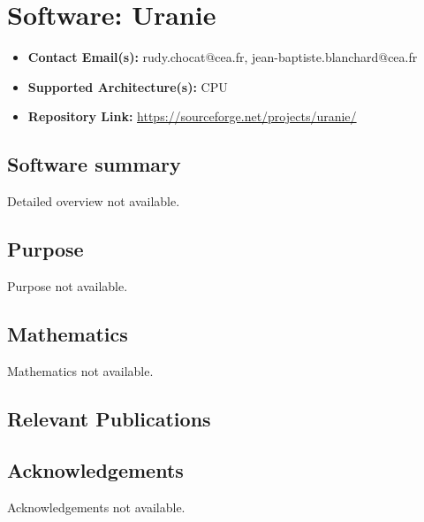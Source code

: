 \section{Software: Uranie}
\label{sec:Uranie:software}



\begin{itemize}
    \item \textbf{Contact Email(s):} rudy.chocat@cea.fr, jean-baptiste.blanchard@cea.fr
    \item \textbf{Supported Architecture(s):} CPU
    \item \textbf{Repository Link:} \href{https://sourceforge.net/projects/uranie/}{https://sourceforge.net/projects/uranie/}
\end{itemize}

\subsection{Software summary}
\label{sec:Uranie:summary}
Detailed overview not available.



\subsection{Purpose}
\label{sec:Uranie:purpose}
Purpose not available.



\subsection{Mathematics}
\label{sec:Uranie:mathematics}
Mathematics not available.


\subsection{Relevant Publications}
\label{sec:Uranie:publications}

\subsection{Acknowledgements}
\label{sec::Uranie:acknowledgements}

Acknowledgements not available.


